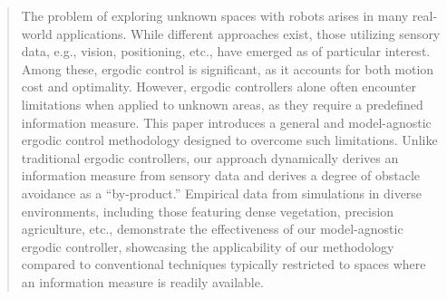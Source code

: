 \documentclass[letterpaper, 10 pt, conference, twoside]{IEEEtran}
\theoremstyle{definition}
\begin{document}
\begin{abstract}
  The problem of exploring unknown spaces with robots arises in many real-world applications. While different approaches exist, those utilizing sensory data, e.g., vision, positioning, etc., have emerged as of particular interest. Among these, ergodic control is significant, as it accounts for both motion cost and optimality. However, ergodic controllers alone often encounter limitations when applied to unknown areas, as they require a predefined information measure. This paper introduces a general and model-agnostic ergodic control methodology designed to overcome such limitations. Unlike traditional ergodic controllers, our approach dynamically derives an information measure from sensory data and derives a degree of obstacle avoidance as a ``by-product.'' Empirical data from simulations in diverse environments, including those featuring dense vegetation, precision agriculture, etc., demonstrate the effectiveness of our model-agnostic ergodic controller, showcasing the applicability of our methodology compared to conventional techniques typically restricted to %
  spaces where an information measure is readily available.
\end{abstract}




\IEEEpubidadjcol
\end{document}
